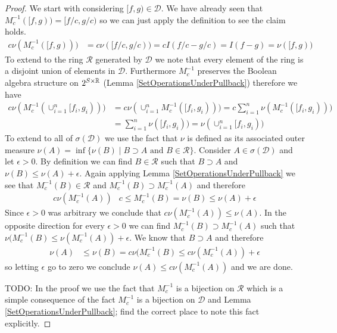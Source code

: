 \begin{proof}
We start with considering $[f,g) \in \mathcal{D}$.  We have already
seen that $M_c^{-1}([f,g)) = [f/c, g/c)$ so we can just apply the
definition to see the claim holds.
\begin{align*}
c \nu(M_c^{-1}([f,g))) &= c \nu([f/c,g/c)) = c I(f/c-g/c) = I(f-g) =
\nu([f,g))
\end{align*}
To extend to the ring $\mathcal{R}$ generated by $\mathcal{D}$ we note that every
element of the ring is a disjoint union of elements in $\mathcal{D}$.
Furthermore $M_c^{-1}$ preserves the Boolean algebra structure on
$2^{S \times \mathbb{R}}$ (Lemma \ref{SetOperationsUnderPullback})
therefore 
we have
\begin{align*}
c \nu(M_c^{-1}(\cup_{i=1}^n [f_i, g_i))) &= c \nu(\cup_{i=1}^n
M_c^{-1}([f_i, g_i))) = c \sum_{i=1}^n \nu(M_c^{-1}([f_i,g_i))) \\
&= \sum_{i=1}^n \nu([f_i,g_i)) = \nu(\cup_{i=1}^n [f_i, g_i))
\end{align*}
To extend to all of $\sigma(\mathcal{D})$ we use the fact that $\nu$
is defined as its associated outer measure $\nu(A) = \inf \lbrace
\nu(B) \mid B \supset A \text{ and } B \in \mathcal{R}\rbrace$.
Consider $A \in \sigma(\mathcal{D})$ and let $\epsilon > 0$.  By
definition we can find $B \in \mathcal{R}$ such that $B \supset A$ and
$\nu(B) \leq \nu(A) + \epsilon$.  Again applying Lemma
\ref{SetOperationsUnderPullback} we see that $M_c^{-1} (B) \in
\mathcal{R}$ and $M_c^{-1}(B) \supset M_c^{-1}(A)$ and therefore
\begin{align*}
c \nu(M_c^{-1}(A)) & c \leq M_c^{-1}(B) = \nu(B) \leq \nu(A) +\epsilon
\end{align*}
Since $\epsilon>0$ was arbitrary we conclude that $c \nu(M_c^{-1}(A))
\leq \nu(A)$.  In the opposite direction for every $\epsilon > 0$ we
can find $M_c^{-1}(B) \supset M_c^{-1}(A)$ such that $\nu(M_c^{-1}(B)
\leq \nu(M_c^{-1}(A)) + \epsilon$.  We know that $B \supset A$ and
therefore
\begin{align*}
\nu(A) &\leq \nu(B) = c \nu(M_c^{-1}(B) \leq c \nu(M_c^{-1}(A)) + \epsilon
\end{align*}
so letting $\epsilon$ go to zero we conclude $\nu(A) \leq c
\nu(M_c^{-1}(A))$ and we are done.

TODO: In the proof we use the fact that $M_c^{-1}$ is a bijection on
$\mathcal{R}$ which is a simple consequence of the fact $M_c^{-1}$ is
a bijection on $\mathcal{D}$ and Lemma \ref{SetOperationsUnderPullback};
find the correct place to note this fact explicitly.
\end{proof}


